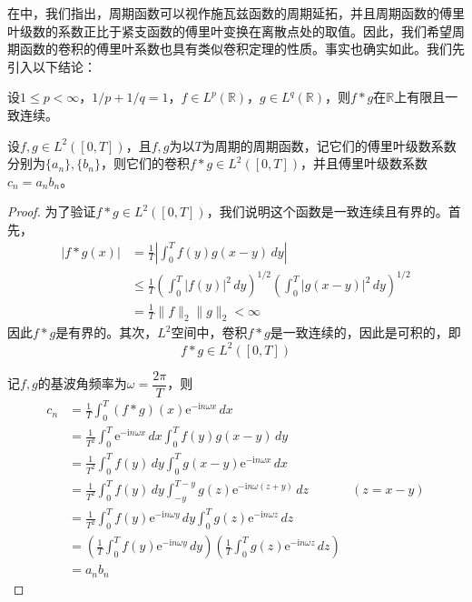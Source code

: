 在中，我们指出，周期函数可以视作施瓦兹函数的周期延拓，并且周期函数的傅里叶级数的系数正比于紧支函数的傅里叶变换在离散点处的取值。因此，我们希望周期函数的卷积的傅里叶系数也具有类似卷积定理的性质。事实也确实如此。我们先引入以下结论：
\begin{claim}
    设$1\le p<\infty$，$1/p+1/q=1$，$f\in L^p(\mathbb{R})$，$g\in L^q(\mathbb{R})$，则$f*g$在$\mathbb{R}$上有限且一致连续。
\end{claim}
\begin{theorem}[周期函数的卷积定理]
    设$f,g\in L^2([0,T])$，且$f,g$为以$T$为周期的周期函数，记它们的傅里叶级数系数分别为$\{a_n\},\{b_n\}$，则它们的卷积$f*g\in L^2([0,T])$，并且傅里叶级数系数$c_n=a_n b_n$。
\end{theorem}
\begin{proof}
    为了验证$f*g\in L^2([0,T])$，我们说明这个函数是一致连续且有界的。首先，
    \begin{align*}
        |f*g(x)|&=\frac{1}{T}\left|\int_0^{T}f(y)g(x-y)\,dy\right|\\
        &\leq \frac{1}{T}\left(\int_0^{T}|f(y)|^2\,dy\right)^{1/2}\left(\int_0^{T}|g(x-y)|^2\,dy\right)^{1/2}\\
        &=\frac{1}{T}\|f\|_2\|g\|_2<\infty
    \end{align*}
    因此$f*g$是有界的。其次，$L^2$空间中，卷积$f*g$是一致连续的，因此是可积的，即
    $$f*g\in L^2([0,T])$$

    记$f,g$的基波角频率为$\omega=\dfrac{2\pi}{T}$，则
    \begin{align*}
        c_n&=\frac{1}{T}\int_0^{T}(f*g)(x)\mathrm{e}^{-\mathrm{i}n\omega x}\,dx\\
        &=\frac{1}{T^2}\int_0^{T}\mathrm{e}^{-\mathrm{i}n\omega x}\,dx\int_0^{T}f(y)g(x-y)\,dy\\
        &=\frac{1}{T^2}\int_0^{T}f(y)\,dy\int_0^{T}g(x-y)\mathrm{e}^{-\mathrm{i}n\omega x}\,dx\\
        &=\frac{1}{T^2}\int_0^{T}f(y)\,dy\int_{-y}^{T-y}g(z)\mathrm{e}^{-\mathrm{i}n\omega (z+y)}\,dz&(z=x-y)\\
        &=\frac{1}{T^2}\int_0^{T}f(y)\mathrm{e}^{-\mathrm{i}n\omega y}\,dy\int_0^{T}g(z)\mathrm{e}^{-\mathrm{i}n\omega z}\,dz\\
        &=\left(\frac{1}{T}\int_0^{T}f(y)\mathrm{e}^{-\mathrm{i}n\omega y}\,dy\right)\left(\frac{1}{T}\int_0^{T}g(z)\mathrm{e}^{-\mathrm{i}n\omega z}\,dz\right)\\
        &=a_n b_n
    \end{align*}
\end{proof}


